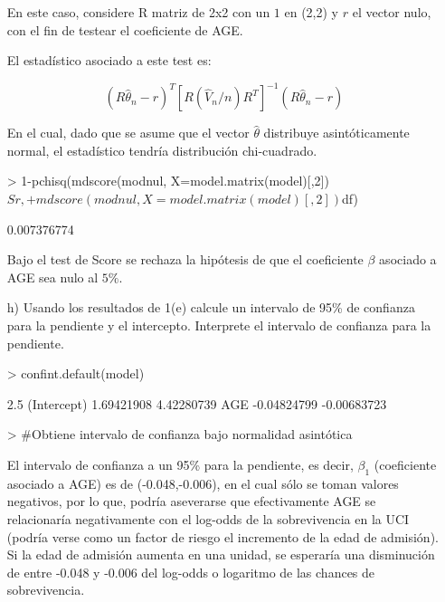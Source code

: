 \documentclass[11pt,onside]{article}
\begin{document}
\begin{itemize}
En este caso, considere R matriz de 2x2 con un $1$ en (2,2) y $r$ el vector nulo, con el fin de testear el coeficiente de AGE.

El estadístico asociado a este test es:

$$(R\hat{\theta}_{n}-r)^{T}[R(\hat{V}_{n}/n)R^{T}]^{-1}(R\hat{\theta}_{n}-r)$$

En el cual, dado que se asume que el vector $\hat{\theta}$ distribuye asintóticamente normal, el estadístico tendría distribución chi-cuadrado.

\begin{Schunk}
\begin{Sinput}
> 1-pchisq(mdscore(modnul, X=model.matrix(model)[,2])$Sr,
+          mdscore(modnul, X=model.matrix(model)[,2])$df)
\end{Sinput}
\begin{Soutput}
[1] 0.007376774
\end{Soutput}
\end{Schunk}

Bajo el test de Score se rechaza la hipótesis de que el coeficiente $\beta$ asociado a AGE sea nulo al $5\%$.

\item[h)] Usando los resultados de 1(e) calcule un intervalo de 95\% de confianza para la pendiente y el intercepto. Interprete el intervalo de confianza para la pendiente.

\begin{Schunk}
\begin{Sinput}
> confint.default(model)  
\end{Sinput}
\begin{Soutput}
                  2.5 %      97.5 %
(Intercept)  1.69421908  4.42280739
AGE         -0.04824799 -0.00683723
\end{Soutput}
\begin{Sinput}
> #Obtiene intervalo de confianza bajo normalidad asintótica
\end{Sinput}
\end{Schunk}


El intervalo de confianza a un 95\% para la pendiente, es decir, $\beta_{1}$ (coeficiente asociado a AGE) es de (-0.048,-0.006), en el cual sólo se toman valores negativos, por lo que, podría aseverarse que efectivamente AGE se relacionaría negativamente con el log-odds de la sobrevivencia en la UCI (podría verse como un factor de riesgo el incremento de la edad de admisión). Si la edad de admisión aumenta en una unidad, se esperaría una disminución de entre -0.048 y -0.006 del log-odds o logaritmo de las chances de sobrevivencia.


\end{itemize}
\end{document}
